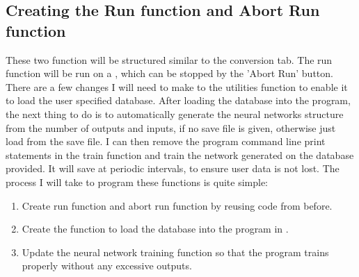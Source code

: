 \documentclass{report}
\begin{document}
\subsection{Creating the Run function and Abort Run function}
These two function will be structured similar to the conversion tab. The run function will be run on a , which can be stopped by the 'Abort Run' button. There are a few changes I will need to make to the utilities function to enable it to load the user specified database. After loading the database into the program, the next thing to do is to automatically generate the neural networks structure from the number of outputs and inputs, if no save file is given, otherwise just load from the save file. I can then remove the program command line print statements in the train function and train the network generated on the database provided. It will save at periodic intervals, to ensure user data is not lost. The process I will take to program these functions is quite simple:
\begin{enumerate}
    \item Create run function and abort run function by reusing code from before.
    \item Create the function to load the database into the program in .
    \item Update the neural network training function so that the program trains properly without any excessive outputs.
\end{enumerate}
\end{document}
